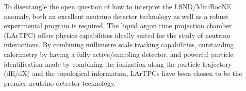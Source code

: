 

To disentangle the open question of how to interpret the LSND/MiniBooNE anomaly, both an excellent neutrino detector technology as well as a robust experimental program is required.  The liquid argon time projection chamber (LArTPC) offers physics capabilities ideally suited for the study of neutrino interactions. By combining millimetre scale tracking capabilities, outstanding calorimetry by having a fully active/sampling detector, and powerful particle identification made by combining the ionization along the particle trajectory (dE/dX) and the topological information, LArTPCs have been chosen to be the premier neutrino detector technology. 

